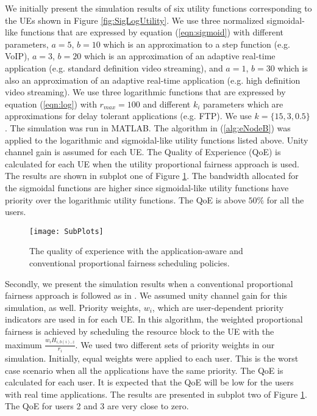 \documentclass[conference]{IEEEtran}
\begin{document}
We initially present the simulation results of six utility functions corresponding to the UEs shown in Figure \ref{fig:SigLogUtility}. We use three normalized sigmoidal-like functions that are expressed by equation (\ref{eqn:sigmoid}) with different parameters, $a = 5$, $b=10$ which is an approximation to a step function (e.g. VoIP), $a = 3$, $b=20$ which is an approximation of an adaptive real-time application (e.g. standard definition video streaming), and $a = 1$,  $b=30$ which is also an approximation of an adaptive real-time application (e.g. high definition video streaming). We use three logarithmic functions that are expressed by equation (\ref{eqn:log}) with $r_{max}=100$ and different $k_i$ parameters which are approximations for delay tolerant applications (e.g. FTP). We use $k =\{15, 3, 0.5\}$. The simulation was run in MATLAB. The algorithm in (\ref{alg:eNodeB}) was applied to the logarithmic and sigmoidal-like utility functions listed above. Unity channel gain is assumed for each UE. The Quality of Experience (QoE) is calculated for each UE when the utility proportional fairness approach is used. The results are shown in subplot one of Figure \ref{fig:sim:SubPlots}. The bandwidth allocated for the sigmoidal functions are higher since sigmoidal-like utility functions have priority over the logarithmic utility functions. The QoE is above $50\%$ for all the users. 

\begin{figure}
    \centering
    \texttt{[image: SubPlots]}
    \caption{The quality of experience with the application-aware and conventional proportional fairness scheduling policies.}
    \label{fig:sim:SubPlots}
\end{figure} 



Secondly, we present the simulation results when a conventional proportional fairness approach is followed as in \cite{SelfOrganizedLTE}. We assumed unity channel gain for this simulation, as well. Priority weights, $w_i$, which are user-dependent priority indicators are used in \cite{SelfOrganizedLTE} for each UE. In this algorithm, the weighted proportional fairness is achieved by scheduling the resource block to the UE with the maximum $\frac{w_iH_{i,b(i),z}}{r_i}$. We used two different sets of priority weights in our simulation. Initially, equal weights were applied to each user. This is the worst case scenario when all the applications have the same priority. The QoE is calculated for each user. It is expected that the QoE will be low for the users with real time applications. The results are presented in subplot two of Figure \ref{fig:sim:SubPlots}. The QoE for users 2 and 3 are very close to zero.    
\end{document}
